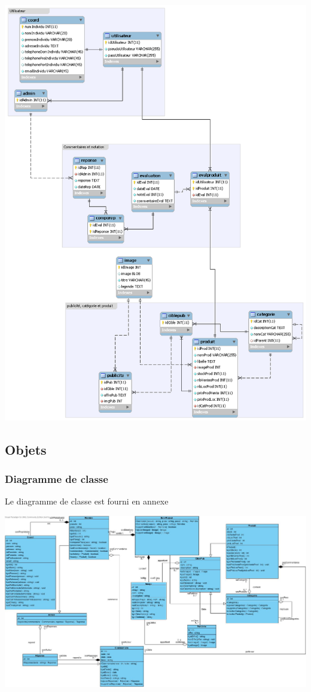 \documentclass[10pt,a4paper]{article}
\begin{document}
				\includegraphics[scale=0.2]{donnees/SR.png}
			\subsection{Objets}
				\subsubsection{Diagramme de classe}
					Le diagramme de classe est fourni en annexe
					\newline
					
					\includegraphics[scale=0.2]{donnees/classes.jpg}
\end{document}
